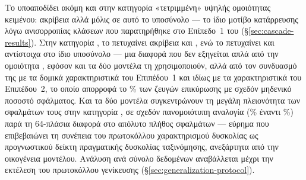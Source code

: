 Το  υποαποδίδει ακόμη και στην κατηγορία «τετριμμένη» υψηλής ομοιότητας
κειμένου: ακρίβεια \SvmHighTextsimAcc{} αλλά  μόλις \SvmHighTextsimFone{} σε αυτό το υποσύνολο ---
το ίδιο μοτίβο κατάρρευσης λόγω ανισορροπίας κλάσεων που παρατηρήθηκε στο Επίπεδο~1
του  (\S\ref{sec:cascade-results}).
Στην κατηγορία , το 
πετυχαίνει ακρίβεια \SvmHardAcc{} και  \SvmHardFone{}, ενώ το 
πετυχαίνει \CascadeHardAcc{} και \CascadeHardFone{} αντίστοιχα στο ίδιο υποσύνολο --- μια διαφορά που δεν
εξηγείται απλά από την ομοιότητα , εφόσον και τα δύο μοντέλα τη
χρησιμοποιούν, αλλά από τον συνδυασμό της με τα δομικά χαρακτηριστικά του Επιπέδου~1
και ιδίως με τα χαρακτηριστικά  του Επιπέδου~2, το οποίο απορροφά το \TierTwoPct\%
των ζευγών επικύρωσης με σχεδόν μηδενικό ποσοστό σφάλματος.
Και τα δύο μοντέλα
συγκεντρώνουν τη μεγάλη πλειονότητα των σφαλμάτων τους στην κατηγορία , σε
σχεδόν πανομοιότυπη αναλογία (\CascadeErrorsHardPct\% έναντι \SvmErrorsHardPct\%) παρά τη 64-πλάσια διαφορά
στο απόλυτο πλήθος σφαλμάτων --- εύρημα που επιβεβαιώνει τη συνέπεια του πρωτοκόλλου
χαρακτηρισμού δυσκολίας ως προγνωστικού δείκτη πραγματικής δυσκολίας ταξινόμησης,
ανεξάρτητα από την οικογένεια μοντέλου.
Ανάλυση ανά σύνολο δεδομένων αναβάλλεται
μέχρι την εκτέλεση του πρωτοκόλλου γενίκευσης (\S\ref{sec:generalization-protocol}).
